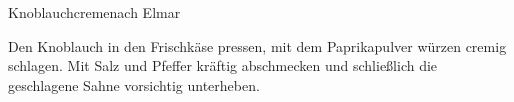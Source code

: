 \begin{recipe}{Knoblauchcreme}{nach Elmar}
  \label{Knoblauchcreme}
  \inglist

  \steps
  Den Knoblauch in den Frischkäse pressen, mit dem Paprikapulver würzen cremig
  schlagen. Mit Salz und Pfeffer kräftig abschmecken und schließlich die
  geschlagene Sahne vorsichtig unterheben.

\end{recipe}
